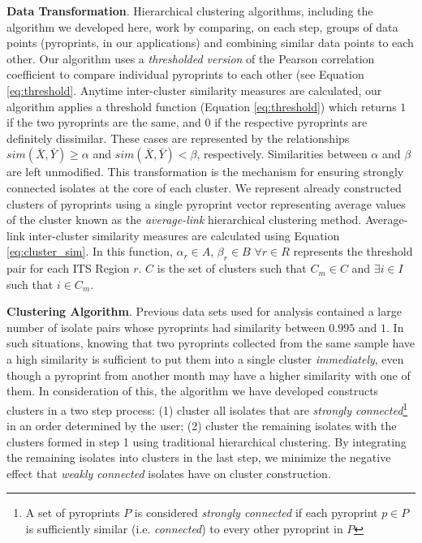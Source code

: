 \documentclass[12pt]{ucthesis}
\begin{document}
      \textbf{Data Transformation}. Hierarchical clustering algorithms, including the
      algorithm we developed here, work by comparing, on each step, groups of data
      points (pyroprints, in our applications) and combining similar data points to
      each other. Our algorithm uses a \textit{thresholded version} of the Pearson
      correlation coefficient to compare individual pyroprints to each other (see
      Equation \ref{eq:threshold}. Anytime inter-cluster similarity measures are
      calculated, our algorithm applies a threshold function (Equation
      \ref{eq:threshold}) which returns $1$ if the two pyroprints are the same, and
      $0$ if the respective pyroprints are definitely dissimilar. These cases are
      represented by the relationships $sim(\bar{X}, \bar{Y}) \ge \alpha$ and
      $sim(\bar{X}, \bar{Y}) < \beta$, respectively. Similarities between $\alpha$ and
      $\beta$ are left unmodified. This transformation is the mechanism for ensuring
      strongly connected isolates at the core of each cluster. We represent already
      constructed clusters of pyroprints using a single pyroprint vector representing
      average values of the cluster known as the \textit{average-link} hierarchical
      clustering method. Average-link inter-cluster similarity measures are
      calculated using Equation \ref{eq:cluster_sim}. In this function, $\alpha_r \in
      A$, $\beta_r \in B$ $\forall r \in R$ represents the threshold pair for each
      ITS Region $r$. $C$ is the set of clusters such that $C_m \in C$ and $\exists i
      \in I$ such that $i \in C_m$.

      \textbf{Clustering Algorithm}. Previous data sets used for analysis contained a
      large number of isolate pairs whose pyroprints had similarity between $0.995$
      and $1$. In such situations, knowing that two pyroprints collected from the
      same sample have a high similarity is sufficient to put them into a single
      cluster \textit{immediately}, even though a pyroprint from another month may
      have a higher similarity with one of them. In consideration of this, the
      algorithm we have developed constructs clusters in a two step process: (1)
      cluster all isolates that are \textit{strongly connected}\footnote{A set of
      pyroprints $P$ is considered \textit{strongly connected} if each pyroprint $p
      \in P$ is sufficiently similar (i.e. \textit{connected}) to every other
      pyroprint in $P$} in an order determined by the user; (2) cluster the remaining
      isolates with the clusters formed in step 1 using traditional hierarchical
      clustering. By integrating the remaining isolates into clusters in the last
      step, we minimize the negative effect that \textit{weakly connected} isolates
      have on cluster construction.
\end{document}
